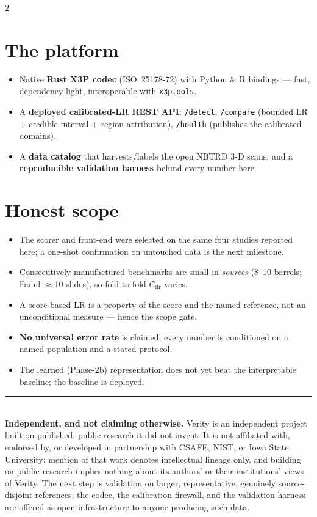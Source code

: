 \documentclass[10pt]{article}
\newcommand{\Cllr}{C_{\mathrm{llr}}}
\newcommand{\code}[1]{\texttt{\small #1}}
\begin{document}
\vspace{4pt}
\begin{multicols}{2}
\section{The platform}
\begin{itemize}
  \item Native \textbf{Rust X3P codec} (ISO~25178-72) with Python \& R bindings ---
        fast, dependency-light, interoperable with \code{x3ptools}.
  \item A \textbf{deployed calibrated-LR REST API}: \code{/detect}, \code{/compare}
        (bounded LR + credible interval + region attribution), \code{/health}
        (publishes the calibrated domains).
  \item A \textbf{data catalog} that harvests/labels the open NBTRD 3-D scans, and a
        \textbf{reproducible validation harness} behind every number here.
\end{itemize}

\columnbreak

\section{Honest scope}
\begin{itemize}
  \item The scorer and front-end were selected on the same four studies reported
        here; a one-shot confirmation on untouched data is the next milestone.
  \item Consecutively-manufactured benchmarks are small in \emph{sources}
        (8--10 barrels; Fadul $\approx\!10$ slides), so fold-to-fold $\Cllr$ varies.
  \item A score-based LR is a property of the score and the named reference, not an
        unconditional measure --- hence the scope gate.
  \item \textbf{No universal error rate} is claimed; every number is conditioned on a
        named population and a stated protocol.
  \item The learned (Phase-2b) representation does not yet beat the interpretable
        baseline; the baseline is deployed.
\end{itemize}
\end{multicols}

\vspace{2pt}
{\color{vblue}\rule{\linewidth}{0.6pt}}\\[2pt]
{\footnotesize\color{vgray}\textbf{Independent, and not claiming otherwise.}
Verity is an independent project built on published, public research it did not
invent. It is not affiliated with, endorsed by, or developed in partnership with
CSAFE, NIST, or Iowa State University; mention of that work denotes intellectual
lineage only, and building on public research implies nothing about its authors'
or their institutions' views of Verity. The next step is validation on larger,
representative, genuinely source-disjoint references; the codec, the calibration
firewall, and the validation harness are offered as open infrastructure to anyone
producing such data.}
\end{document}
